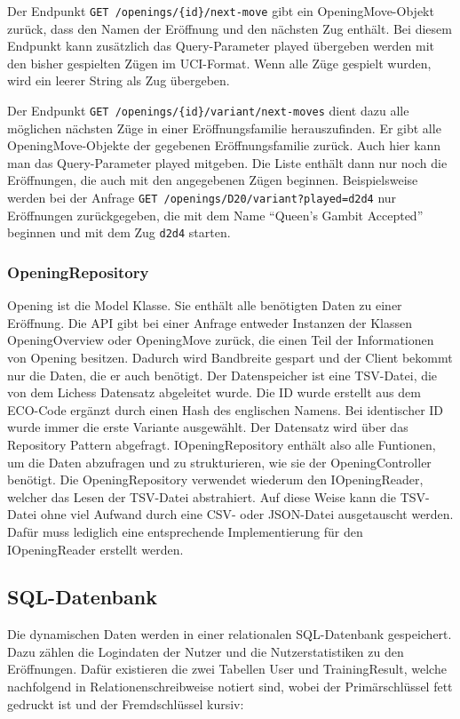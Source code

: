Der Endpunkt \lstinline|GET /openings/{id}/next-move| gibt ein OpeningMove-Objekt zurück, dass den Namen der Eröffnung und den nächsten Zug enthält. Bei diesem Endpunkt kann zusätzlich das Query-Parameter played übergeben werden mit den bisher gespielten Zügen im \ac{UCI}-Format. Wenn alle Züge gespielt wurden, wird ein leerer String als Zug übergeben.

Der Endpunkt \lstinline|GET /openings/{id}/variant/next-moves| dient dazu alle möglichen nächsten Züge in einer Eröffnungsfamilie herauszufinden. Er gibt alle OpeningMove-Objekte der gegebenen Eröffnungsfamilie zurück. Auch hier kann man das Query-Parameter played mitgeben. Die Liste enthält dann nur noch die Eröffnungen, die auch mit den angegebenen Zügen beginnen. Beispielsweise werden bei der Anfrage \lstinline|GET /openings/D20/variant?played=d2d4| nur Eröffnungen zurückgegeben, die mit dem Name \enquote{Queen's Gambit Accepted} beginnen und mit dem Zug \lstinline|d2d4| starten.


\subsubsection{OpeningRepository}
Opening ist die Model Klasse. Sie enthält alle benötigten Daten zu einer Eröffnung. Die API gibt bei einer Anfrage entweder Instanzen der Klassen OpeningOverview oder OpeningMove zurück, die einen Teil der Informationen von Opening besitzen. Dadurch wird Bandbreite gespart und der Client bekommt nur die Daten, die er auch benötigt. Der Datenspeicher ist eine TSV-Datei, die von dem Lichess Datensatz abgeleitet wurde. Die ID wurde erstellt aus dem ECO-Code ergänzt durch einen Hash des englischen Namens. Bei identischer ID wurde immer die erste Variante ausgewählt.
Der Datensatz wird über das Repository Pattern abgefragt. IOpeningRepository enthält also alle Funtionen, um die Daten abzufragen und zu strukturieren, wie sie der OpeningController benötigt. Die OpeningRepository verwendet wiederum den IOpeningReader, welcher das Lesen der TSV-Datei abstrahiert. Auf diese Weise kann die TSV-Datei ohne viel Aufwand durch eine CSV- oder JSON-Datei ausgetauscht werden. Dafür muss lediglich eine entsprechende Implementierung für den IOpeningReader erstellt werden.

\subsection{SQL-Datenbank}
Die dynamischen Daten werden in einer relationalen SQL-Datenbank gespeichert. Dazu zählen die Logindaten der Nutzer und die Nutzerstatistiken zu den Eröffnungen. Dafür existieren die zwei Tabellen User und TrainingResult, welche nachfolgend in Relationenschreibweise notiert sind, wobei der Primärschlüssel fett gedruckt ist und der Fremdschlüssel kursiv:

